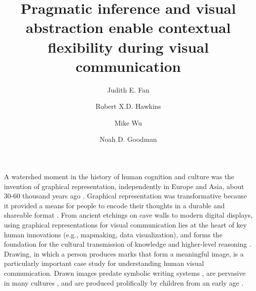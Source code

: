 \documentclass[9pt,twocolumn,twoside]{pnas-new}
\title{Pragmatic inference and visual abstraction enable contextual flexibility during visual communication}
\author[a,1]{Judith E. Fan}
\author[a]{Robert X.D. Hawkins}
\author[b]{Mike Wu}
\author[a,b]{Noah D. Goodman}
\affil[a]{Department of Psychology, Stanford University}
\affil[b]{Department of Computer Science, Stanford University}
\begin{document}
\verticaladjustment{-2pt}

\maketitle
\thispagestyle{firststyle}


A watershed moment in the history of human cognition and culture was the invention of graphical representation, independently in Europe and Asia, about 30-60 thousand years ago \cite{hoffmann2018u,Aubert:2014jy}. 
Graphical representation was transformative because it provided a means for people to encode their thoughts in a durable and shareable format \cite{donald1991origins}. 
From ancient etchings on cave walls to modern digital displays, using graphical representations for visual communication lies at the heart of key human innovations (e.g., mapmaking, data visualization), and forms the foundation for the cultural transmission of knowledge and higher-level reasoning \cite{tomasello2009cultural,card1999readings}. 
Drawing, in which a person produces marks that form a meaningful image, is a particularly important case study for understanding human visual communication. Drawn images predate symbolic writing systems \cite{clottes2008cave}, are pervasive in many cultures \cite{gombrich1989story}, and are produced prolifically by children from an early age \cite{kellogg1969analyzing}.
\end{document}
